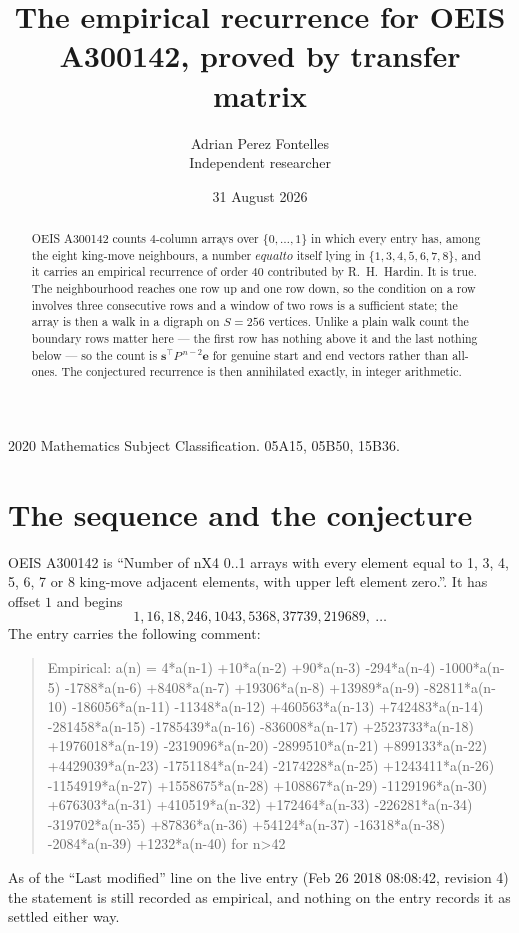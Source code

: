 \documentclass[11pt,a4paper]{article}
\title{The empirical recurrence for OEIS A300142, proved by transfer matrix}
\author{Adrian Perez Fontelles\\ \small Independent researcher}
\date{31 August 2026}
\theoremstyle{plain}
\theoremstyle{definition}
\begin{document}
\maketitle

\begin{abstract}
OEIS A300142 counts $4$-column arrays over $\{0,\dots,1\}$ in which every entry has,
among the eight king-move neighbours, a number $equal to$ itself lying in $\{1,3,4,5,6,7,8\}$, and it carries an empirical
recurrence of order $40$ contributed by R.~H.~Hardin. It is true. The neighbourhood
reaches one row up and one row down, so the condition on a row involves three consecutive
rows and a window of two rows is a sufficient state; the array is then a walk in a digraph
on $S=256$ vertices. Unlike a plain walk count the boundary rows matter here --- the first
row has nothing above it and the last nothing below --- so the count is
$\mathbf{s}^{\!\top}P^{\,n-2}\mathbf{e}$ for genuine start and end vectors rather than
all-ones. The conjectured recurrence is then annihilated exactly, in integer arithmetic.
\end{abstract}

\noindent\small 2020 Mathematics Subject Classification. 05A15, 05B50, 15B36.\normalsize

\section{The sequence and the conjecture}

OEIS A300142 is ``Number of nX4 0..1 arrays with every element equal to 1, 3, 4, 5, 6, 7 or 8 king-move adjacent elements, with upper left element zero.''. It has offset
$1$ and begins
\[
1, 16, 18, 246, 1043, 5368, 37739, 219689,\ \dots
\]
The entry carries the following comment:
\begin{quote}\small
Empirical: a(n) = 4*a(n-1) +10*a(n-2) +90*a(n-3) -294*a(n-4) -1000*a(n-5) -1788*a(n-6) +8408*a(n-7) +19306*a(n-8) +13989*a(n-9) -82811*a(n-10) -186056*a(n-11) -11348*a(n-12) +460563*a(n-13) +742483*a(n-14) -281458*a(n-15) -1785439*a(n-16) -836008*a(n-17) +2523733*a(n-18) +1976018*a(n-19) -2319096*a(n-20) -2899510*a(n-21) +899133*a(n-22) +4429039*a(n-23) -1751184*a(n-24) -2174228*a(n-25) +1243411*a(n-26) -1154919*a(n-27) +1558675*a(n-28) +108867*a(n-29) -1129196*a(n-30) +676303*a(n-31) +410519*a(n-32) +172464*a(n-33) -226281*a(n-34) -319702*a(n-35) +87836*a(n-36) +54124*a(n-37) -16318*a(n-38) -2084*a(n-39) +1232*a(n-40) for n>42
\end{quote}
As of the ``Last modified'' line on the live entry (Feb 26 2018 08:08:42, revision
4) the statement is still recorded as empirical, and nothing on the entry
records it as settled either way.
\end{document}
